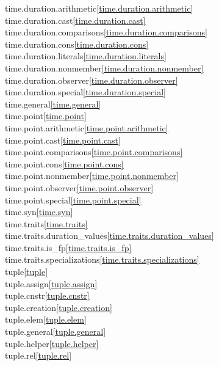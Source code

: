 \begin{multicols}{2}
time.duration.arithmetic\quad\ref{time.duration.arithmetic}\\
time.duration.cast\quad\ref{time.duration.cast}\\
time.duration.comparisons\quad\ref{time.duration.comparisons}\\
time.duration.cons\quad\ref{time.duration.cons}\\
time.duration.literals\quad\ref{time.duration.literals}\\
time.duration.nonmember\quad\ref{time.duration.nonmember}\\
time.duration.observer\quad\ref{time.duration.observer}\\
time.duration.special\quad\ref{time.duration.special}\\
time.general\quad\ref{time.general}\\
time.point\quad\ref{time.point}\\
time.point.arithmetic\quad\ref{time.point.arithmetic}\\
time.point.cast\quad\ref{time.point.cast}\\
time.point.comparisons\quad\ref{time.point.comparisons}\\
time.point.cons\quad\ref{time.point.cons}\\
time.point.nonmember\quad\ref{time.point.nonmember}\\
time.point.observer\quad\ref{time.point.observer}\\
time.point.special\quad\ref{time.point.special}\\
time.syn\quad\ref{time.syn}\\
time.traits\quad\ref{time.traits}\\
time.traits.duration_values\quad\ref{time.traits.duration_values}\\
time.traits.is_fp\quad\ref{time.traits.is_fp}\\
time.traits.specializations\quad\ref{time.traits.specializations}\\
tuple\quad\ref{tuple}\\
tuple.assign\quad\ref{tuple.assign}\\
tuple.cnstr\quad\ref{tuple.cnstr}\\
tuple.creation\quad\ref{tuple.creation}\\
tuple.elem\quad\ref{tuple.elem}\\
tuple.general\quad\ref{tuple.general}\\
tuple.helper\quad\ref{tuple.helper}\\
tuple.rel\quad\ref{tuple.rel}\\

\end{multicols}
